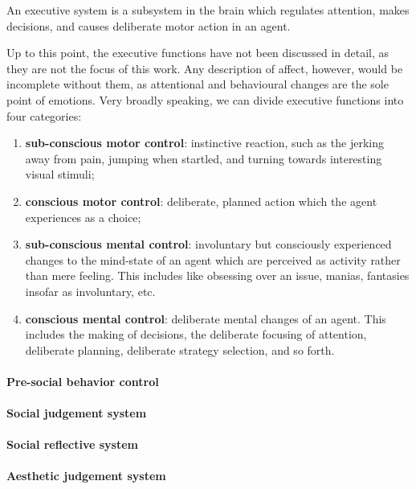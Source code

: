 \begin{definition}
An executive system is a subsystem in the brain which regulates attention, makes decisions, and causes deliberate motor action in an agent.
\end{definition}

Up to this point, the executive functions have not been discussed in detail, as they are not the focus of this work. Any description of affect, however, would be incomplete without them, as attentional and behavioural changes are the sole point of emotions. Very broadly speaking, we can divide executive functions into four categories:

\begin{enumerate}
	\item \textbf{sub-conscious motor control}: instinctive reaction, such as the jerking away from pain, jumping when startled, and turning towards interesting visual stimuli;
	\item \textbf{conscious motor control}: deliberate, planned action which the agent experiences as a choice;
	\item \textbf{sub-conscious mental control}: involuntary but consciously experienced changes to the mind-state of an agent which are perceived as activity rather than mere feeling. This includes like obsessing over an issue, manias, fantasies insofar as involuntary, etc.
	\item \textbf{conscious mental control}: deliberate mental changes of an agent. This includes the making of decisions, the deliberate focusing of attention, deliberate planning, deliberate strategy selection, and so forth.
\end{enumerate}

\paragraph{Pre-social behavior control} 

\paragraph{Social judgement system}

\paragraph{Social reflective system}

\paragraph{Aesthetic judgement system}